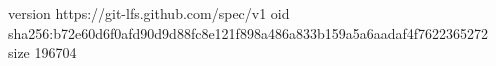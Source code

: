 version https://git-lfs.github.com/spec/v1
oid sha256:b72e60d6f0afd90d9d88fc8e121f898a486a833b159a5a6aadaf4f7622365272
size 196704
